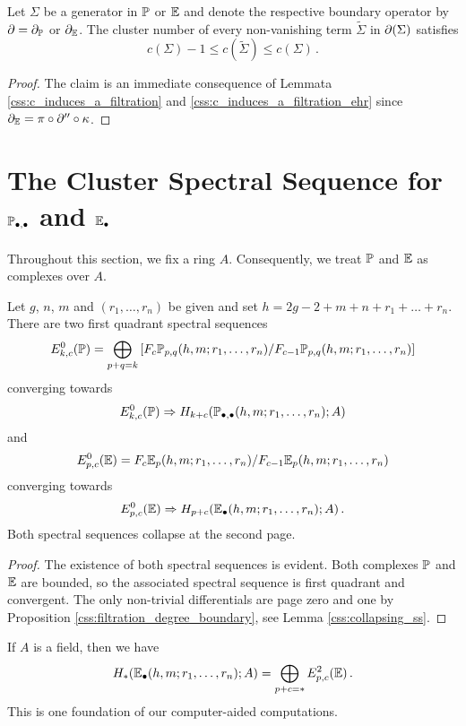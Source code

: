 \begin{prop}
    \label{css:filtration_degree_boundary}
    Let $\Sigma$ be a generator in $\mathbb P$ or $\mathbb E$ and denote the respective boundary operator by $\partial = \partial_{\mathbb P}$ or $\partial_\mathbb E$.
    The cluster number of every non-vanishing term $\tilde\Sigma$ in $\partial(\Sigma)$ satisfies
    \[
        c( \Sigma ) -1 \leq c( \tilde\Sigma ) \leq c(\Sigma) \,.
    \]
\end{prop}
\begin{proof}
    The claim is an immediate consequence of Lemmata \ref{css:c_induces_a_filtration} and \ref{css:c_induces_a_filtration_ehr} since $\partial_\mathbb E = \pi \circ \partial'' \circ \kappa$.
\end{proof}

\section{The Cluster Spectral Sequence for \texorpdfstring{$\mathbb P_{\bullet, \bullet}$}{P} and \texorpdfstring{$\mathbb E_\bullet$}{E}}
\label{css:cluster_spectral_sequence_chapter}%
Throughout this section, we fix a ring $A$.
Consequently, we treat $\mathbb P$ and $\mathbb E$ as complexes over $A$.

\begin{prop}
    \label{css:cluster_spectral_sequence}
    Let $g$, $n$, $m$ and $(r_1, \ldots, r_n)$ be given and set $h = 2g-2+m+n+r_1 + \ldots + r_n$.
    There are two first quadrant spectral sequences
    \[
        E^0_{k,c}(\PP) = \bigoplus_{p+q=k}\left[F_c\PP_{p,q}(h,m;r_1, \ldots, r_n) / F_{c-1}\PP_{p,q}(h,m;r_1, \ldots, r_n) \right]
    \]
    converging towards
    \[
        E^0_{k,c}(\PP) \Rightarrow H_{k+c}( \PP_{\bullet, \bullet}(h,m;r_1, \ldots, r_n) ; A )
    \]
    and
    \[
        E^0_{p,c}(\E) = F_c\E_p(h,m;r_1, \ldots, r_n) / F_{c-1}\E_p(h,m;r_1, \ldots, r_n)
    \]
    converging towards
    \[
        E^0_{p,c}(\E) \Rightarrow H_{p+c}( \E_\bullet(h,m;r_1, \ldots, r_n); A ) \,.
    \]
    Both spectral sequences collapse at the second page.
\end{prop}
\begin{proof}
    The existence of both spectral sequences is evident.
    Both complexes $\mathbb P$ and $\mathbb E$ are bounded, so the associated spectral sequence is first quadrant and convergent.
    The only non-trivial differentials are page zero and one by Proposition \ref{css:filtration_degree_boundary}, see Lemma \ref{css:collapsing_ss}.
\end{proof}
\begin{rem}
If $A$ is a field, then we have
\[
    H_\ast( \E_\bullet(h,m;r_1, \ldots, r_n); A ) = \bigoplus_{p+c=\ast} E^2_{p,c}(\E) \,.
\]
This is one foundation of our computer-aided computations.
\end{rem}

